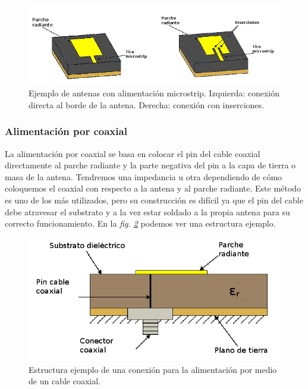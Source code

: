 \begin{figure}[!htb]
    \centering
    \includegraphics[scale=0.55]{./ContextoTecnologico/microstrip_feed}
    \caption{Ejemplo de antenas con alimentación microstrip. Izquierda: conexión directa al borde de la antena. Derecha: conexión con inserciones.}
    \label{fig:fig2.3}
\end{figure}

\subsubsection{Alimentación por coaxial}

La alimentación por coaxial se basa en colocar el pin del cable coaxial directamente al parche radiante y la parte negativa del pin a la capa de tierra o masa de la antena. Tendremos una impedancia u otra dependiendo de cómo coloquemos el coaxial con respecto a la antena y al parche radiante. Este método es uno de los más utilizados, pero su construcción es difícil ya que el pin del cable debe atravesar el substrato y a la vez estar soldado a la propia antena para su correcto funcionamiento. En la \textit{fig. \ref{fig:fig2.4}} podemos ver una estructura ejemplo.

\begin{figure}[!htb]
    \centering
    \includegraphics[scale=0.55]{./ContextoTecnologico/coaxial}
    \caption{Estructura ejemplo de una conexión para la alimentación por medio de un cable coaxial.}
    \label{fig:fig2.4}
\end{figure}

